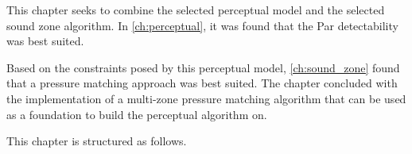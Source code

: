 This chapter seeks to combine the selected perceptual model and the selected sound zone algorithm.
In \autoref{ch:perceptual}, it was found that the Par detectability was best suited.

Based on the constraints posed by this perceptual model, \autoref{ch:sound_zone} found that a pressure matching approach was 
best suited.
The chapter concluded with the implementation of a multi-zone pressure matching algorithm that can be used as a foundation
to build the perceptual algorithm on. 

This chapter is structured as follows.
